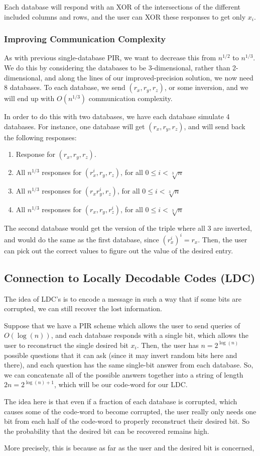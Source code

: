 \documentclass[11pt]{article}
\begin{document}
Each database will respond with an XOR of the intersections of the different included columns and rows, and the user can XOR these responses to get only \(x_i\).

\subsubsection{Improving Communication Complexity}
As with previous single-database PIR, we want to decrease this from \(n^{1/2}\) to \(n^{1/3}\).
We do this by considering the databases to be 3-dimensional, rather than 2-dimensional, and along the lines of our improved-precision solution, we now need 8 databases.
To each database, we send \((r_x,r_y,r_z)\), or some inversion, and we will end up with \(O(n^{1/3})\) communication complexity.

In order to do this with two databases, we have each database simulate 4 databases. 
For instance, one database will get \((r_x,r_y,r_z)\), and will send back the following responses:
\begin{enumerate}
\item Response for \((r_x,r_y,r_z)\).
\item All \(n^{1/3}\) responses for \((r_x^i,r_y,r_z)\), for all \(0\le i<\sqrt[3]{n}\)
\item All \(n^{1/3}\) responses for \((r_xr_y^i,r_z)\), for all \(0\le i<\sqrt[3]{n}\)
\item All \(n^{1/3}\) responses for \((r_x,r_y,r_z^i)\), for all \(0\le i<\sqrt[3]{n}\)
\end{enumerate}
The second database would get the version of the triple where all 3 are inverted, and would do the same as the first database, since \((r_x^i)^i = r_x\).
Then, the user can pick out the correct values to figure out the value of the desired entry.

\subsection{Connection to Locally Decodable Codes (LDC)}
The idea of LDC's is to encode a message in such a way that if some bits are corrupted, we can still recover the lost information.

Suppose that we have a PIR scheme which allows the user to send queries of \(O(\log(n))\), and each database responds with a single bit, which allows the user to reconstruct the single desired bit \(x_i\).
Then, the user has \(n = 2^{\log(n)}\) possible questions that it can ask (since it may invert random bits here and there), and each question has the same single-bit answer from each database.
So, we can concatenate all of the possible answers together into a string of length \(2n = 2^{\log(n)+1}\), which will be our code-word for our LDC.

The idea here is that even if a fraction of each database is corrupted, which causes some of the code-word to become corrupted, the user really only needs one bit from each half of the code-word to properly reconstruct their desired bit.
So the probability that the desired bit can be recovered remains high.

More precisely, this is because as far as the user and the desired bit is concerned, 
\end{document}
